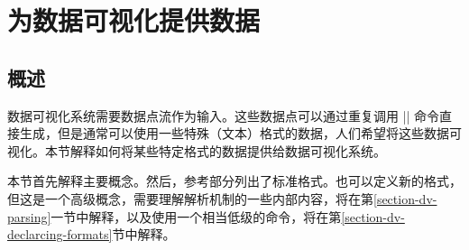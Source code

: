 %
%
%


\section{为数据可视化提供数据}
\label{section-dv-formats}

\subsection{概述}


数据可视化系统需要数据点流作为输入。这些数据点可以通过重复调用 |\pgfdatapoint| 命令直接生成，但是通常可以使用一些特殊（文本）格式的数据，人们希望将这些数据可视化。本节解释如何将某些特定格式的数据提供给数据可视化系统。


本节首先解释主要概念。然后，参考部分列出了标准格式。也可以定义新的格式，但这是一个高级概念，需要理解解析机制的一些内部内容，将在第\ref{section-dv-parsing}一节中解释，以及使用一个相当低级的命令，将在第\ref{section-dv-declarcing-formats}节中解释。


